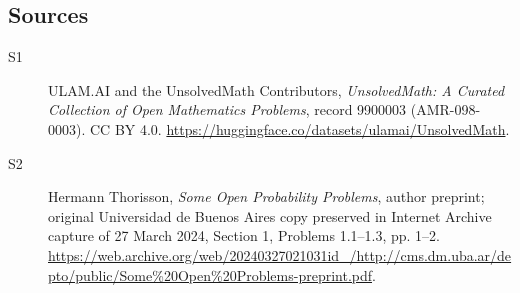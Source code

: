 \documentclass[11pt]{article}
\begin{document}
\subsection{Sources}
\begin{description}
\item[\hypertarget{source:9900003:1}{S1}] ULAM.AI and the UnsolvedMath Contributors, \emph{UnsolvedMath: A Curated Collection of Open Mathematics Problems}, record 9900003 (AMR-098-0003). CC BY 4.0. \url{https://huggingface.co/datasets/ulamai/UnsolvedMath}.
\item[\hypertarget{source:9900003:2}{S2}] Hermann Thorisson, \emph{Some Open Probability Problems}, author preprint; original Universidad de Buenos Aires copy preserved in Internet Archive capture of 27 March 2024, Section 1, Problems 1.1--1.3, pp. 1--2. \url{https://web.archive.org/web/20240327021031id_/http://cms.dm.uba.ar/depto/public/Some%20Open%20Problems-preprint.pdf}.
\end{description}
\label{end:9900003}
\end{document}
